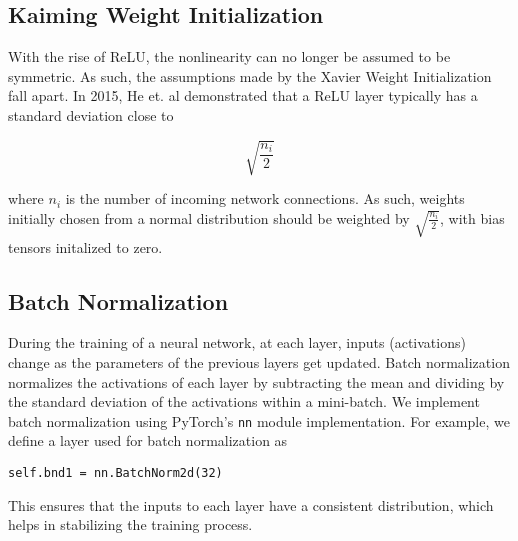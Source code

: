 \subsection*{Kaiming Weight Initialization}
With the rise of ReLU, the nonlinearity can no longer be assumed to be symmetric. As such, the assumptions made by the Xavier Weight Initialization fall apart. In 2015, He et. al demonstrated that a ReLU layer typically has a standard deviation close to

\begin{equation}
	\sqrt{\displaystyle\frac{n_{i}}{2}}
\end{equation}

where $n_i$ is the number of incoming network connections. As such, weights initially chosen from a normal distribution should be weighted by $\sqrt{\frac{n_{i}}{2}}$, with bias tensors initalized to zero.

\subsection*{Batch Normalization}
During the training of a neural network, at each layer, inputs (activations) change as the parameters of the previous layers get updated. Batch normalization normalizes the activations of each layer by subtracting the mean and dividing by the standard deviation of the activations within a mini-batch. We implement batch normalization using PyTorch's \texttt{nn} module implementation. For example, we define a layer used for batch normalization as

\begin{center}
\texttt{self.bnd1 = nn.BatchNorm2d(32)}
\end{center} 

This ensures that the inputs to each layer have a consistent distribution, which helps in stabilizing the training process.
